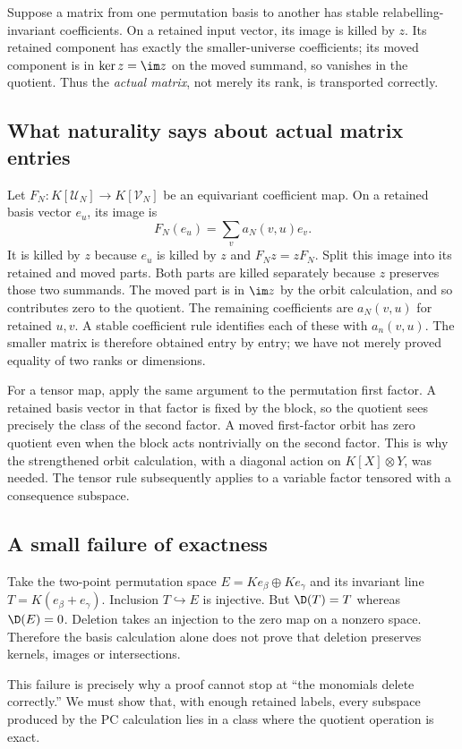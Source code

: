 Suppose a matrix from one permutation basis to another has stable relabelling-invariant coefficients. On a retained input vector, its image is killed by $z$. Its retained component has exactly the smaller-universe coefficients; its moved component is in $\ker z=\im z$ on the moved summand, so vanishes in the quotient. Thus the \emph{actual matrix}, not merely its rank, is transported correctly.

\subsection{What naturality says about actual matrix entries}
Let $F_N:K[\mathcal U_N]\to K[\mathcal V_N]$ be an equivariant
coefficient map. On a retained basis vector $e_u$, its image is
\[
                       F_N(e_u)=\sum_v a_N(v,u)e_v.
\]
It is killed by $z$ because $e_u$ is killed by $z$ and $F_Nz=zF_N$.
Split this image into its retained and moved parts. Both parts are
killed separately because $z$ preserves those two summands. The moved
part is in $\im z$ by the orbit calculation, and so contributes zero
to the quotient. The remaining coefficients are $a_N(v,u)$ for
retained $u,v$. A stable coefficient rule identifies each of these
with $a_n(v,u)$. The smaller matrix is therefore obtained entry by
entry; we have not merely proved equality of two ranks or dimensions.

For a tensor map, apply the same argument to the permutation first
factor. A retained basis vector in that factor is fixed by the block,
so the quotient sees precisely the class of the second factor. A moved
first-factor orbit has zero quotient even when the block acts
nontrivially on the second factor. This is why the strengthened orbit
calculation, with a diagonal action on $K[X]\otimes Y$, was needed.
The tensor rule subsequently applies to a variable factor tensored
with a consequence subspace.

\subsection{A small failure of exactness}
Take the two-point permutation space $E=Ke_\beta\oplus Ke_\gamma$ and its invariant line $T=K(e_\beta+e_\gamma)$. Inclusion $T\hookrightarrow E$ is injective. But $\D(T)=T$ whereas $\D(E)=0$. Deletion takes an injection to the zero map on a nonzero space. Therefore the basis calculation alone does not prove that deletion preserves kernels, images or intersections.

This failure is precisely why a proof cannot stop at ``the monomials delete correctly.'' We must show that, with enough retained labels, every subspace produced by the PC calculation lies in a class where the quotient operation is exact.

